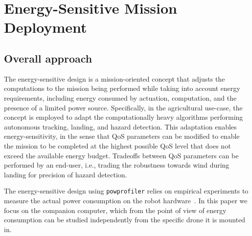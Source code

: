 \documentclass[conference]{IEEEtran}
\newcommand{\stt}[1]{{\small\tt #1}} %
\newcommand{\powprof}{\stt{powprofiler}}
\begin{document}
\section{Energy-Sensitive Mission Deployment} 
\label{sec:approach}

\subsection{Overall approach}

The energy-sensitive design is a mission-oriented concept that adjusts
the computations to the mission being performed while taking into
account energy requirements, including energy consumed by actuation,
computation, and the presence of a limited power source. Specifically,
in the agricultural use-case, the concept is employed to adapt the
computationally heavy algorithms performing autonomous tracking,
landing, and hazard detection. This adaptation enables
energy-sensitivity, in the sense that QoS parameters can be modified
to enable the mission to be completed at the highest possible QoS
level that does not exceed the available energy budget. Tradeoffs
between QoS parameters can be performed by an end-user, i.e., trading
the robustness towards wind during landing for precision of hazard
detection.

The energy-sensitive design using \powprof{} relies on empirical
experiments to measure the actual power consumption on the robot
hardware~\cite{seewald2019coarse}. In this paper we focus on the
companion computer, which from the point of view of energy consumption
can be studied independently from the specific drone it is mounted in.
\end{document}
